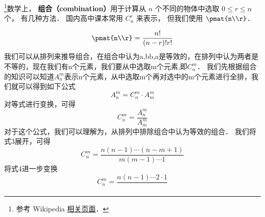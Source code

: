 
\begin{issues}
\issueDraft
\end{issues}


\footnote{参考 Wikipedia \href{https://en.wikipedia.org/wiki/Combination}{相关页面}．}数学上， \textbf{组合（combination）}用于计算从 $n$ 个不同的物体中选取 $0 \leqslant r \leqslant n$ 个， 有几种方法． 国内高中课本常用 $C_n^r$ 来表示， 但我们使用 $\pmat{n\\r}$．

\begin{equation}
\pmat{n\\r} = \frac{n!}{(n-r)!r!}
\end{equation}
我们可以从排列来推导组合，在组合中认为{a,b}{b,a}是等效的，在排列中认为两者是不等的，现在我们有n个元素，我们要从中选取m个元素,即$C_n^m$．
我们先根据组合的知识可以知道$A_n^m$表示n个元素，从中选取m个再对选中的m个元素进行全排，我们就可以得到如下公式\begin{equation}
A_n^m = C_n^m \cdot A_m^m
\end{equation}
对等式进行变换，可得\begin{equation}
C_n^m = \frac{A_n^m}{A_m^m}
\end{equation}
对于这个公式，我们可以理解为，从排列中排除组合中认为等效的组合．
我们将式3展开，可得
\begin{equation}
C_n^m = \frac{n(n - 1) \cdots (n - m + 1)}{m(m-1)\cdots 1}
\end{equation}
将式4进一步变换
\begin{equation}
C_n^m = \frac{n(n-1) \cdots 2 \cdot 1}{}
\end{equation}
